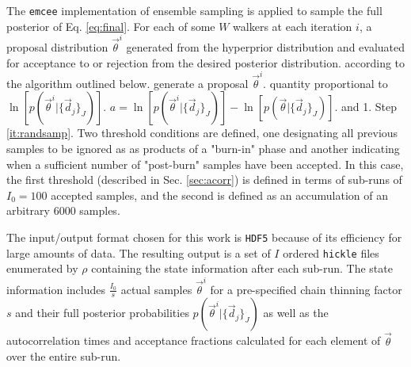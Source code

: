 \documentclass[preprint]{aastex}
\begin{document}
The \texttt{emcee} \citep{Foreman-Mackey2013} implementation of ensemble 
sampling is applied to sample the full posterior of Eq. \ref{eq:final}.   For 
each of some $W$ walkers at each iteration $i$, a proposal distribution 
$\vec{\theta}^{i}$ generated from the hyperprior distribution and evaluated for 
acceptance to or rejection from the desired posterior distribution.  %
according to the algorithm outlined below.  
%
generate a proposal $\vec{\theta}^{i}$.
quantity proportional to $\ln[p(\vec{\theta}^{i}|\{\vec{d}_{j}\}_{J})]$.
$a=\ln[p(\vec{\theta}^{i}|\{\vec{d}_{j}\}_{J})]-\ln[p(\vec{\theta}|\{\vec{d}_{j}
\}_{J})]$.
and 1.
Step \ref{it:randsamp}.
Two threshold conditions are defined, one designating all previous samples to 
be ignored as as products of a "burn-in" phase and another indicating when a 
sufficient number of "post-burn" samples have been accepted.  In this case, the 
first threshold (described in Sec. \ref{sec:acorr}) is defined in terms of 
sub-runs of $I_{0}=100$ accepted samples, and the second is defined as an 
accumulation of an arbitrary 6000 samples.

The input/output format chosen for this work is \texttt{HDF5} because of its 
efficiency for large amounts of data.  The resulting output is a set of $I$ 
ordered \texttt{hickle} files enumerated by $\rho$ containing the state 
information after each sub-run.  The state information includes 
$\frac{I_{0}}{s}$ actual samples $\vec{\theta}^{i}$ for a pre-specified chain 
thinning factor $s$ and their full posterior probabilities 
$p(\vec{\theta}^{i}|\{\vec{d}_{j}\}_{J})$ as well as the autocorrelation times 
and acceptance fractions calculated for each element of $\vec{\theta}$ over the 
entire sub-run.  
\end{document}

